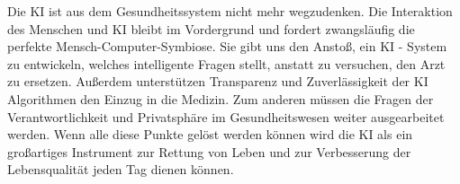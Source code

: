 Die KI ist aus dem Gesundheitssystem nicht mehr wegzudenken. Die Interaktion des Menschen und KI bleibt im Vordergrund und fordert zwangsläufig die perfekte Mensch-Computer-Symbiose. Sie gibt uns den Anstoß, ein KI - System zu entwickeln, welches intelligente Fragen stellt, anstatt zu versuchen, den Arzt zu ersetzen. Außerdem unterstützen Transparenz und Zuverlässigkeit der KI Algorithmen den Einzug in die Medizin. Zum anderen müssen die Fragen der Verantwortlichkeit und Privatsphäre im Gesundheitswesen weiter ausgearbeitet werden. Wenn alle diese Punkte gelöst werden können wird die KI als ein großartiges Instrument zur Rettung von Leben und zur Verbesserung der Lebensqualität jeden Tag dienen können.